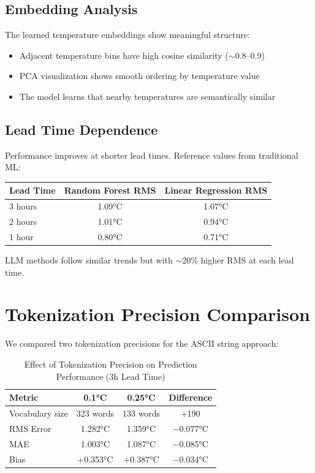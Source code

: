 \documentclass[11pt]{article}
\begin{document}
\subsection{Embedding Analysis}
The learned temperature embeddings show meaningful structure:
\begin{itemize}
    \item Adjacent temperature bins have high cosine similarity ($\sim$0.8--0.9)
    \item PCA visualization shows smooth ordering by temperature value
    \item The model learns that nearby temperatures are semantically similar
\end{itemize}

\subsection{Lead Time Dependence}
Performance improves at shorter lead times. Reference values from traditional ML:
\begin{center}
\begin{tabular}{lcc}
\toprule
Lead Time & Random Forest RMS & Linear Regression RMS \\
\midrule
3 hours & 1.09°C & 1.07°C \\
2 hours & 1.01°C & 0.94°C \\
1 hour & 0.80°C & 0.71°C \\
\bottomrule
\end{tabular}
\end{center}
LLM methods follow similar trends but with $\sim$20\% higher RMS at each lead time.

\section{Tokenization Precision Comparison}

We compared two tokenization precisions for the ASCII string approach:

\begin{table}[h]
\centering
\caption{Effect of Tokenization Precision on Prediction Performance (3h Lead Time)}
\label{tab:precision}
\begin{tabular}{lccc}
\toprule
\textbf{Metric} & \textbf{0.1°C} & \textbf{0.25°C} & \textbf{Difference} \\
\midrule
Vocabulary size & 323 words & 133 words & +190 \\
RMS Error & 1.282°C & 1.359°C & $-$0.077°C \\
MAE & 1.003°C & 1.087°C & $-$0.085°C \\
Bias & +0.353°C & +0.387°C & $-$0.034°C \\
\bottomrule
\end{tabular}
\end{table}
\end{document}
